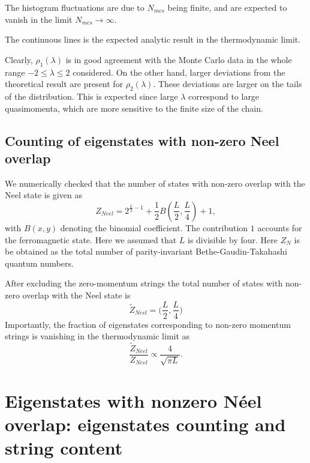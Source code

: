 \documentclass[11pt]{iopart}
\begin{document}
The histogram fluctuations are due to $N_{mcs}$ being finite, and are expected 
to vanish in the limit $N_{mcs}\to\infty$. 

The continuous lines is the expected analytic result in the thermodynamic limit. 

Clearly, $\rho_1(\lambda)$ is in good agreement with the Monte Carlo data in the 
whole range $-2\le\lambda\le2$ considered. 
On the other hand, larger deviations from the theoretical result are present 
for $\rho_2(\lambda)$. These deviations are larger on the tails of the 
distribution. This is expected since large $\lambda$ correspond to large 
quasimomenta, which are more sensitive to the finite size of the chain. 



\subsection{Counting of eigenstates with non-zero Neel overlap}

We numerically checked that the number of states with non-zero overlap 
with the Neel state is given as 
%
\begin{equation}
\label{Neel-count}
Z_{Neel}=2^{\frac{L}{2}-1}+\frac{1}{2}B\left(\frac{L}{2},
\frac{L}{4}\right)+1,
\end{equation}
%
with $B(x,y)$ denoting the binomial coefficient. The contribution $1$ 
accounts for the ferromagnetic state. Here 
we assumed that $L$ is divisible by four. Here $Z_N$ is be obtained 
as the total number of parity-invariant Bethe-Gaudin-Takahashi quantum 
numbers. 

After excluding the zero-momentum strings the total number of states 
with non-zero overlap with the Neel state is 
%
\begin{equation}
\label{neel-ov-count}
\widetilde {Z}_{Neel}=\Big(\frac{L}{2},\frac{L}{4}\Big)
\end{equation}
%
Importantly, the fraction of eigenstates corresponding to non-zero momentum 
strings is vanishing in the thermodynamic limit as 
%
\begin{equation}
\frac{\widetilde Z_{Neel}}{Z_{Neel}}\propto\frac{4}{\sqrt{\pi L}}.
\end{equation}
%

\appendix

\section{Eigenstates with nonzero N\'eel overlap: eigenstates counting and 
string content}
\label{app-1}
\end{document}
